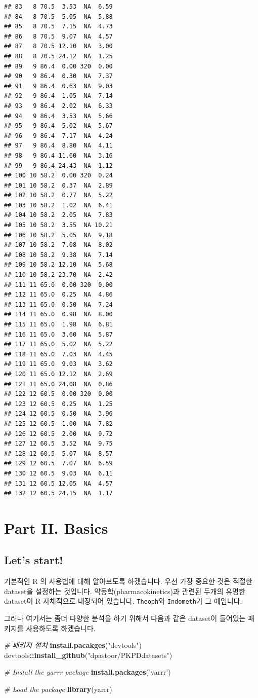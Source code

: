 \documentclass[12pt,]{krantz}
\makeatletter
\newenvironment{Shaded}{\begin{snugshade}}{\end{snugshade}}
\newcommand{\KeywordTok}[1]{\textcolor[rgb]{0.13,0.29,0.53}{\textbf{#1}}}
\newcommand{\StringTok}[1]{\textcolor[rgb]{0.31,0.60,0.02}{#1}}
\newcommand{\CommentTok}[1]{\textcolor[rgb]{0.56,0.35,0.01}{\textit{#1}}}
\newcommand{\OperatorTok}[1]{\textcolor[rgb]{0.81,0.36,0.00}{\textbf{#1}}}
\newcommand{\NormalTok}[1]{#1}
\newenvironment{kframe}{%
\medskip{}
\setlength{\fboxsep}{.8em}
 \def\at@end@of@kframe{}%
 \ifinner\ifhmode%
  \def\at@end@of@kframe{\end{minipage}}%
  \begin{minipage}{\columnwidth}%
 \fi\fi%
 \def\FrameCommand##1{\hskip\@totalleftmargin \hskip-\fboxsep
 \colorbox{shadecolor}{##1}\hskip-\fboxsep
     \hskip-\linewidth \hskip-\@totalleftmargin \hskip\columnwidth}%
 \MakeFramed {\advance\hsize-\width
   \@totalleftmargin\z@ \linewidth\hsize
   \@setminipage}}%
 {\par\unskip\endMakeFramed%
 \at@end@of@kframe}
\renewenvironment{Shaded}{\begin{kframe}}{\end{kframe}}
\theoremstyle{definition}
\theoremstyle{definition}
\theoremstyle{remark}
\makeatother
\begin{document}
\begin{verbatim}
## 83   8 70.5  3.53  NA  6.59
## 84   8 70.5  5.05  NA  5.88
## 85   8 70.5  7.15  NA  4.73
## 86   8 70.5  9.07  NA  4.57
## 87   8 70.5 12.10  NA  3.00
## 88   8 70.5 24.12  NA  1.25
## 89   9 86.4  0.00 320  0.00
## 90   9 86.4  0.30  NA  7.37
## 91   9 86.4  0.63  NA  9.03
## 92   9 86.4  1.05  NA  7.14
## 93   9 86.4  2.02  NA  6.33
## 94   9 86.4  3.53  NA  5.66
## 95   9 86.4  5.02  NA  5.67
## 96   9 86.4  7.17  NA  4.24
## 97   9 86.4  8.80  NA  4.11
## 98   9 86.4 11.60  NA  3.16
## 99   9 86.4 24.43  NA  1.12
## 100 10 58.2  0.00 320  0.24
## 101 10 58.2  0.37  NA  2.89
## 102 10 58.2  0.77  NA  5.22
## 103 10 58.2  1.02  NA  6.41
## 104 10 58.2  2.05  NA  7.83
## 105 10 58.2  3.55  NA 10.21
## 106 10 58.2  5.05  NA  9.18
## 107 10 58.2  7.08  NA  8.02
## 108 10 58.2  9.38  NA  7.14
## 109 10 58.2 12.10  NA  5.68
## 110 10 58.2 23.70  NA  2.42
## 111 11 65.0  0.00 320  0.00
## 112 11 65.0  0.25  NA  4.86
## 113 11 65.0  0.50  NA  7.24
## 114 11 65.0  0.98  NA  8.00
## 115 11 65.0  1.98  NA  6.81
## 116 11 65.0  3.60  NA  5.87
## 117 11 65.0  5.02  NA  5.22
## 118 11 65.0  7.03  NA  4.45
## 119 11 65.0  9.03  NA  3.62
## 120 11 65.0 12.12  NA  2.69
## 121 11 65.0 24.08  NA  0.86
## 122 12 60.5  0.00 320  0.00
## 123 12 60.5  0.25  NA  1.25
## 124 12 60.5  0.50  NA  3.96
## 125 12 60.5  1.00  NA  7.82
## 126 12 60.5  2.00  NA  9.72
## 127 12 60.5  3.52  NA  9.75
## 128 12 60.5  5.07  NA  8.57
## 129 12 60.5  7.07  NA  6.59
## 130 12 60.5  9.03  NA  6.11
## 131 12 60.5 12.05  NA  4.57
## 132 12 60.5 24.15  NA  1.17
\end{verbatim}

\part{Part II. Basics}\label{part-part-ii.-basics}

\chapter{Let's start!}\label{start}

기본적인 R 의 사용법에 대해 알아보도록 하겠습니다. 우선 가장 중요한 것은
적절한 dataset을 설정하는 것입니다. 약동학(pharmacokinetics)과 관련된
두개의 유명한 dataset이 R 자체적으로 내장되어 있습니다.
\texttt{Theoph}와 \texttt{Indometh}가 그 예입니다.

그러나 여기서는 좀더 다양한 분석을 하기 위해서 다음과 같은 dataset이
들어있는 패키지를 사용하도록 하겠습니다.

\begin{Shaded}
\begin{Highlighting}[]
\CommentTok{# 패키지 설치}
\KeywordTok{install.pacakges}\NormalTok{(}\StringTok{"devtools"}\NormalTok{)}
\NormalTok{devtools}\OperatorTok{::}\KeywordTok{install_github}\NormalTok{(}\StringTok{"dpastoor/PKPDdatasets"}\NormalTok{)}

\CommentTok{# Install the yarrr package}
\KeywordTok{install.packages}\NormalTok{(}\StringTok{'yarrr'}\NormalTok{)}

\CommentTok{# Load the package}
\KeywordTok{library}\NormalTok{(yarrr)}
\end{Highlighting}
\end{Shaded}
\end{document}
